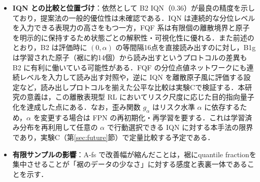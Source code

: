 \documentclass[a4paper,10pt]{jsarticle}
\theoremstyle{definition}
\begin{document}
\begin{itemize}
  \item \textbf{IQN との比較と位置づけ}：依然として B2 IQN（0.36）が最良の精度を示しており，提案法の一般的優位性は未確認である．IQN は連続的な分位レベルを入力できる表現力の高さをもつ一方，FQF 系は有限個の離散境界と原子を明示的に保持するため状態ごとの解釈性・可視化性に優れる．また前述のとおり，B2 は評価時に $(0,\alpha)$ の等間隔16点を直接読み出すのに対し，B1g は学習された原子（裾に約14個）から読み出すというプロトコルの差異も B2 に有利に働いている可能性がある．FQF の分位点値ネットワークにも連続レベルを入力して読み出す対照や，逆に IQN を離散原子風に評価する設定など，読み出しプロトコルを揃えた公平な比較は実験Cで検証する．本研究の意義は，この離散表現型 RL においてリスク尺度に応じた目的指向量子化を達成した点にある．なお，歪み関数 $g_\alpha$ はリスク水準 $\alpha$ に依存するため，$\alpha$ を変更する場合は FPN の再初期化・再学習を要する．これは学習済み分布を再利用して任意の $\alpha$ で行動選択できる IQN に対する本手法の限界であり，実験C（第\ref{sec:future}節）で定量比較する予定である．
  \item \textbf{有限サンプルの影響}：A-fs で改善幅が縮んだことは，裾にquantile fractionを集中させることが「裾のデータの少なさ」に対する感度と表裏一体であることを示す．
\end{itemize}
\end{document}
